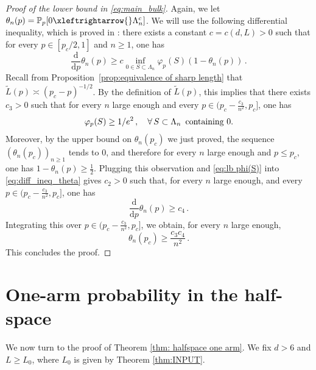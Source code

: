 \documentclass[11pt,a4paper]{article}
\numberwithin{equation}{section}
\theoremstyle{plain}
\theoremstyle{definition}
\newcommand{\connect}{\xleftrightarrow}
\newcommand{\1}{\mathbf 1}
\begin{document}
\begin{proof}[Proof of the lower bound in \eqref{eq:main_bulk}] 
	Again, we let $\theta_n(p)=\mathbb P_p[0\connect{}\Lambda_n^c]$.
	We will use the following differential inequality, which is proved in \cite[Lemma~1.4]{DuminilTassionNewProofSharpness2016}: there exists a constant $c=c(d,L)>0$ such that for every $p\in [p_c/2,1]$ and $n\geq1$, one has 
	\begin{equation}\label{eq:diff_ineq_theta}
		\frac{\mathrm{d}}{\mathrm{d}p}\theta_n(p)\geq c\inf_{0\in S\subset \Lambda_n}\varphi_p(S)(1-\theta_n(p))\,.
	\end{equation}
	Recall from Proposition~\ref{prop:equivalence of sharp length} that $\tilde L(p) \asymp (p_c-p)^{-1/2}$.  By the definition of $\tilde{L}(p)$, this implies that there exists $c_3>0$ such that for every $n$ large enough and every $p\in (p_c- \frac{c_3}{n^2}, p_c]$, one has 
	\begin{equation}\label{eq:lb phi(S)}
		\varphi_p(S) \geq 1/e^{2}\,, ~~~ \forall \,   S \subset \Lambda_n\, \textup{ containing $0$}.
	\end{equation}
	Moreover, by the upper bound on $\theta_n(p_c)$ we just proved, the sequence $(\theta_n(p_c))_{n\geq 1}$ tends to $0$, and therefore for every $n$ large enough and $p\leq p_c$, one has $1-\theta_n(p)\geq \tfrac{1}{2}$. Plugging this observation and \eqref{eq:lb phi(S)} into \eqref{eq:diff_ineq_theta} gives $c_2>0$ such that, for every $n$ large enough, and every $p\in (p_c-\tfrac{c_3}{n^2}, p_c]$, one has
	\begin{equation}
			\frac{\mathrm{d}}{\mathrm{d}p}\theta_n(p)\geq c_4\,. 
	\end{equation}
	Integrating this over $p\in (p_c-\tfrac{c_3}{n^2}, p_c]$, we obtain, for every $n$ large enough,
	\begin{equation}\label{}
		\theta_n(p_c) \geq \frac{c_3c_4}{n^2}\,.
	\end{equation}
	This concludes the proof.
\end{proof}









\section{One-arm probability in the half-space}\label{sec:onearmhalf}

We now turn to the proof of Theorem \ref{thm: halfspace one arm}.  We fix $d>6$ and $L\geq L_0$, where $L_0$ is given by Theorem \ref{thm:INPUT}.
\end{document}
